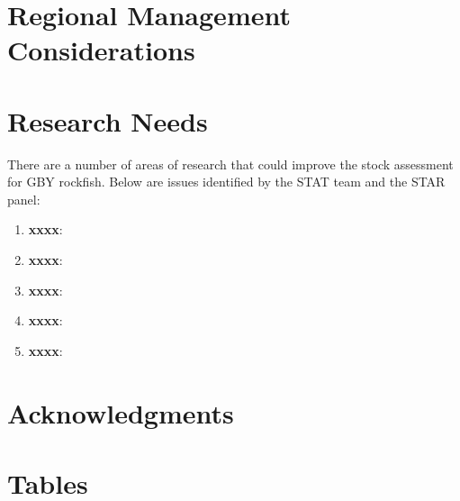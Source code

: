 \documentclass[12pt,]{article}
\begin{document}
\section{Regional Management
Considerations}\label{regional-management-considerations}

\section{Research Needs}\label{research-needs}

There are a number of areas of research that could improve the stock
assessment for GBY rockfish. Below are issues identified by the STAT
team and the STAR panel:

\begin{enumerate}

\item \textbf{xxxx}: 

\item \textbf{xxxx}:

\item \textbf{xxxx}:

\item \textbf{xxxx}:

\item \textbf{xxxx}:

\end{enumerate}

\section{Acknowledgments}\label{acknowledgments}

\newpage

\FloatBarrier

\section{Tables}\label{tables}

\FloatBarrier
\end{document}
